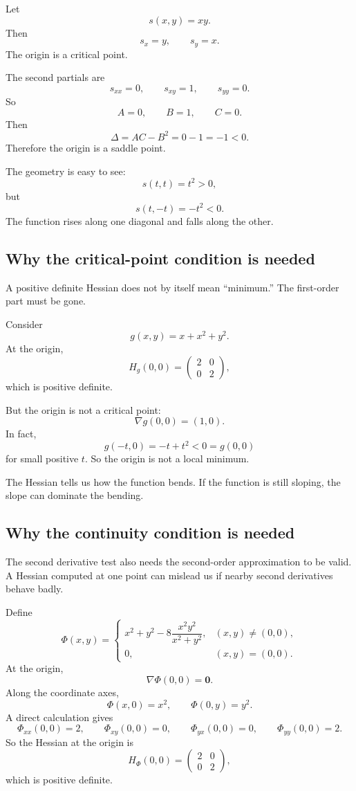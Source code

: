 \begin{example}
Let
\[
    s(x,y)=xy.
\]
Then
\[
    s_x=y,
    \qquad
    s_y=x.
\]
The origin is a critical point.

The second partials are
\[
    s_{xx}=0,
    \qquad
    s_{xy}=1,
    \qquad
    s_{yy}=0.
\]
So
\[
    A=0,
    \qquad
    B=1,
    \qquad
    C=0.
\]
Then
\[
    \Delta=AC-B^2=0-1=-1<0.
\]
Therefore the origin is a saddle point.

The geometry is easy to see:
\[
    s(t,t)=t^2>0,
\]
but
\[
    s(t,-t)=-t^2<0.
\]
The function rises along one diagonal and falls along the other.
\end{example}

\subsection{Why the critical-point condition is needed}

A positive definite Hessian does not by itself mean ``minimum.''  The first-order part
must be gone.

Consider
\[
    g(x,y)=x+x^2+y^2.
\]
At the origin,
\[
    H_g(0,0)=
    \begin{pmatrix}
        2&0\\
        0&2
    \end{pmatrix},
\]
which is positive definite.

But the origin is not a critical point:
\[
    \nabla g(0,0)=(1,0).
\]
In fact,
\[
    g(-t,0)=-t+t^2<0=g(0,0)
\]
for small positive \(t\).  So the origin is not a local minimum.

The Hessian tells us how the function bends.  If the function is still sloping, the slope
can dominate the bending.

\subsection{Why the continuity condition is needed}

The second derivative test also needs the second-order approximation to be valid.  A
Hessian computed at one point can mislead us if nearby second derivatives behave badly.

Define
\[
    \Phi(x,y)=
    \begin{cases}
    x^2+y^2-8\dfrac{x^2y^2}{x^2+y^2}, & (x,y)\ne(0,0),\\[3mm]
    0, & (x,y)=(0,0).
    \end{cases}
\]
At the origin,
\[
    \nabla \Phi(0,0)=\mathbf 0.
\]
Along the coordinate axes,
\[
    \Phi(x,0)=x^2,
    \qquad
    \Phi(0,y)=y^2.
\]
A direct calculation gives
\[
    \Phi_{xx}(0,0)=2,
    \qquad
    \Phi_{xy}(0,0)=0,
    \qquad
    \Phi_{yx}(0,0)=0,
    \qquad
    \Phi_{yy}(0,0)=2.
\]
So the Hessian at the origin is
\[
    H_\Phi(0,0)=
    \begin{pmatrix}
        2&0\\
        0&2
    \end{pmatrix},
\]
which is positive definite.

